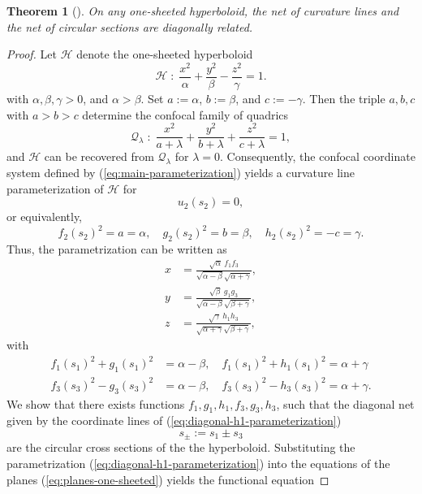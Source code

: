 \documentclass[10pt, a4paper]{article}
\theoremstyle{BoldTopSpacing}
\newtheorem{theorem}{Theorem}[section]
\theoremstyle{BoldTopSpacing}
\theoremstyle{BoldTopSpacing}
\theoremstyle{BoldTopBottomSpacing}
\theoremstyle{BoldTopSpacing}
\theoremstyle{BoldTopBottomSpacing}
\theoremstyle{remark}
\begin{document}
\begin{theorem}[]
\label{thm:diagonally-related-one-sheeted}
On any one-sheeted hyperboloid, the net of curvature lines and the net of circular sections are diagonally related.
\end{theorem}
\begin{proof}
Let $\mathcal{H}$ denote the one-sheeted hyperboloid
\[
    \mathcal{H} \; : \; \frac{x^2}{\alpha} + \frac{y^2}{\beta} - \frac{z^2}{\gamma} = 1.
\]
with $\alpha, \beta, \gamma > 0$, and $\alpha > \beta$. Set $a := \alpha$, $b := \beta$, and $c := -\gamma$. Then the triple $a, b, c$ with $a > b > c$ determine the confocal family of quadrics
\[
    \mathcal{Q}_{\lambda} \; : \; \frac{x^2}{a+\lambda} + \frac{y^2}{b+\lambda} + \frac{z^2}{c+\lambda} = 1,
\]
and $\mathcal{H}$ can be recovered from $\mathcal{Q}_{\lambda}$ for $\lambda = 0$. Consequently, the confocal coordinate system defined by (\ref{eq:main-parameterization}) yields a curvature line parameterization of $\mathcal{H}$ for
\[
    u_{2}(s_{2}) = 0,
\]
or equivalently,
\[
    f_{2}(s_{2})^2 = a = \alpha, \quad g_{2}(s_{2})^2 = b = \beta, \quad h_{2}(s_{2})^2 = -c = \gamma.
\]
Thus, the parametrization can be written as
\begin{equation}
\begin{aligned}
\label{eq:diagonal-h1-parameterization}
    x &= \frac{\sqrt{\alpha} \ f_{1} f_{3}}{\sqrt{\alpha - \beta}\sqrt{\alpha + \gamma}}, \\
    y &= \frac{\sqrt{\beta} \ g_{1} g_{3}}{\sqrt{\alpha - \beta}\sqrt{\beta + \gamma}}, \\
    z &= \frac{\sqrt{ \gamma } \ h_{1} h_{3}}{\sqrt{\alpha + \gamma}\sqrt{\beta + \gamma}},
\end{aligned}
\end{equation}
with
\begin{equation}
\begin{aligned}
\label{eq:functional-relations-h1}
    f_{1}(s_{1})^2 + g_{1}(s_{1})^2 &= \alpha - \beta, \quad f_{1}(s_{1})^2 + h_{1}(s_{1})^2 = \alpha + \gamma \\
    f_{3}(s_{3})^2 - g_{3}(s_{3})^2 &= \alpha - \beta, \quad f_{3}(s_{3})^2 - h_{3}(s_{3})^2 = \alpha + \gamma.
\end{aligned}
\end{equation}
We show that there exists functions $f_1, g_1, h_1, f_3, g_3, h_3$, such that the diagonal net given by the coordinate lines of (\ref{eq:diagonal-h1-parameterization})
\[
    s_{\pm} := s_{1} \pm s_{3}
\]
are the circular cross sections of the the hyperboloid. Substituting the parametrization (\ref{eq:diagonal-h1-parameterization}) into the equations of the planes (\ref{eq:planes-one-sheeted}) yields the functional equation

\end{proof}
\end{document}
